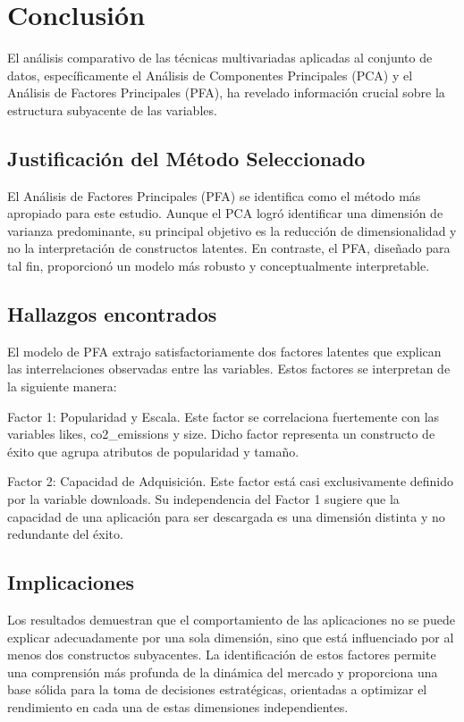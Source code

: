\documentclass[journal]{IEEEtran}
\begin{document}
	\section{Conclusión}
	\label{sec:conclusion}
	El análisis comparativo de las técnicas multivariadas aplicadas al conjunto de datos, específicamente el Análisis de Componentes Principales (PCA) y el Análisis de Factores Principales (PFA), ha revelado información crucial sobre la estructura subyacente de las variables.
	
	\subsection{Justificación del Método Seleccionado}
	El Análisis de Factores Principales (PFA) se identifica como el método más apropiado para este estudio. Aunque el PCA logró identificar una dimensión de varianza predominante, su principal objetivo es la reducción de dimensionalidad y no la interpretación de constructos latentes. En contraste, el PFA, diseñado para tal fin, proporcionó un modelo más robusto y conceptualmente interpretable.
	
	\subsection{Hallazgos encontrados}
	El modelo de PFA extrajo satisfactoriamente dos factores latentes que explican las interrelaciones observadas entre las variables.  Estos factores se interpretan de la siguiente manera:
	
	Factor 1: Popularidad y Escala. Este factor se correlaciona fuertemente con las variables likes, co2\_emissions y size. Dicho factor representa un constructo de éxito que agrupa atributos de popularidad y tamaño.
	
	Factor 2: Capacidad de Adquisición. Este factor está casi exclusivamente definido por la variable downloads. Su independencia del Factor 1 sugiere que la capacidad de una aplicación para ser descargada es una dimensión distinta y no redundante del éxito.
	
	\subsection{Implicaciones}
	Los resultados demuestran que el comportamiento de las aplicaciones no se puede explicar adecuadamente por una sola dimensión, sino que está influenciado por al menos dos constructos subyacentes. La identificación de estos factores permite una comprensión más profunda de la dinámica del mercado y proporciona una base sólida para la toma de decisiones estratégicas, orientadas a optimizar el rendimiento en cada una de estas dimensiones independientes.
	
\end{document}
